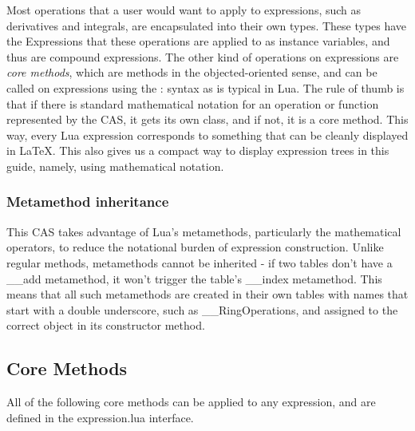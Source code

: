 \documentclass{article}
\begin{document}
Most operations that a user would want to apply to expressions, such as derivatives and integrals, are encapsulated into their own types. These types have the {\ttfamily Expression}s that these operations are applied to as instance variables, and thus are compound expressions. The other kind of operations on expressions are \emph{core methods}, which are methods in the objected-oriented sense, and can be called on expressions using the {\ttfamily :} syntax as is typical in Lua. The rule of thumb is that if there is standard mathematical notation for an operation or function represented by the CAS, it gets its own class, and if not, it is a core method. This way, every Lua expression corresponds to something that can be cleanly displayed in \LaTeX{}. This also gives us a compact way to display expression trees in this guide, namely, using mathematical notation.


\subsubsection{Metamethod inheritance}
This CAS takes advantage of Lua's metamethods, particularly the mathematical operators, to reduce the notational burden of expression construction. Unlike regular methods, metamethods cannot be inherited - if two tables don't have a {\ttfamily \_\_add} metamethod, it won't trigger the table's {\ttfamily \_\_index} metamethod. This means that all such metamethods are created in their own tables with names that start with a double underscore, such as {\ttfamily \_\_RingOperations}, and assigned to the correct object in its constructor method.


\subsection{Core Methods}

All of the following core methods can be applied to any expression, and are defined in the {\ttfamily expression.lua} interface.
\end{document}
